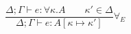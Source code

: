 \[
\frac { \Delta ;\Gamma \vdash e:\forall\kappa. A \quad \quad \kappa' \in \Delta }{ \Delta;\Gamma\vdash e : A [\kappa \mapsto \kappa'] } { \forall }_{ E }
\]
